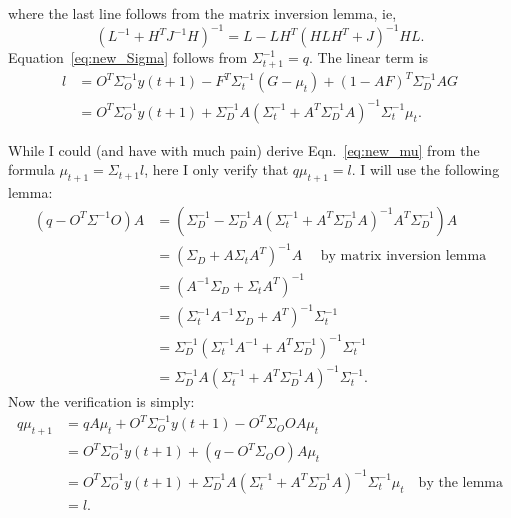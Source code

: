 \documentclass[12pt]{article}
\newcommand{\ti}[2]{{#1}{(#2)}}                         %
\begin{document}
where the last line follows from the matrix inversion lemma, ie,
\begin{equation*}
  (L^{-1} + H^T J^{-1} H)^{-1} = L - LH^T (HLH^T + J)^{-1} HL.
\end{equation*}
Equation~\eqref{eq:new_Sigma} follows from $\Sigma_{t+1}^{-1} = q$.
The linear term is
\begin{align*}
  l &= O^T\Sigma_O^{-1}y(t+1) - F^T \Sigma_t^{-1}(G-\mu_t) +
  (1-AF)^T\Sigma_D^{-1}AG \\
  &= O^T\Sigma_O^{-1}y(t+1) + \Sigma_D^{-1}A \left( \Sigma_t^{-1} +
    A^T \Sigma_D^{-1} A \right)^{-1} \Sigma_t^{-1} \mu_t.
\end{align*}

While I could (and have with much pain) derive Eqn.~\eqref{eq:new_mu}
from the formula $\mu_{t+1} = \Sigma_{t+1} l$, here I only verify that
$q \mu_{t+1} = l$.  I will use the following lemma:
\begin{align*}
  (q-O^T\Sigma^{-1}O)A &= \left( \Sigma_D^{-1} - \Sigma_D^{-1} A (
    \Sigma_t^{-1} + A^T \Sigma_D^{-1} A)^{-1} A^T \Sigma_D^{-1}
  \right) A \\
  &= (\Sigma_D + A \Sigma_t A^T)^{-1} A \quad \text{ by matrix inversion
    lemma} \\
  &= (A^{-1} \Sigma_D + \Sigma_t A^T)^{-1} \\
  &= (\Sigma_t^{-1} A^{-1} \Sigma_D + A^T)^{-1} \Sigma_t^{-1}\\
  &= \Sigma_D^{-1} (\Sigma_t^{-1} A^{-1}  + A^T\Sigma_D^{-1})^{-1} \Sigma_t^{-1}\\
  &= \Sigma_D^{-1} A (\Sigma_t^{-1}  + A^T\Sigma_D^{-1} A)^{-1} \Sigma_t^{-1}.
\end{align*}
Now the verification is simply:
\begin{align*}
  q \mu_{t+1} &= qA\mu_t + O^T \Sigma_O^{-1} \ti{y}{t+1} - O^T
  \Sigma_O O A \mu_t \\
  &= O^T \Sigma_O^{-1} \ti{y}{t+1} + (q - O^T \Sigma_O O) A \mu_t \\
  &= O^T\Sigma_O^{-1}y(t+1) + \Sigma_D^{-1}A \left( \Sigma_t^{-1} +
    A^T \Sigma_D^{-1} A \right)^{-1} \Sigma_t^{-1} \mu_t \quad \text{
    by the lemma}\\
  &= l.
\end{align*}
\end{document}
